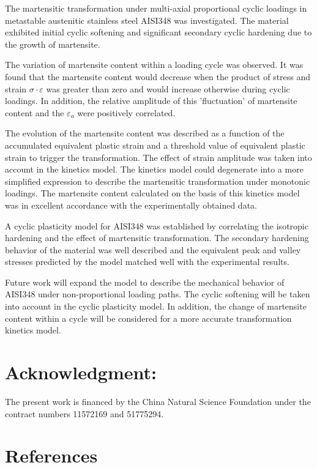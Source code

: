 \documentclass[final,5p,times,onecolumn,10pt,sort&compress]{elsarticle}
\begin{document}
The martensitic transformation under multi-axial proportional cyclic loadings in metastable austenitic stainless steel AISI348 was investigated. The material exhibited initial cyclic softening and significant secondary cyclic hardening due to the growth of martensite.

The variation of martensite content within a loading cycle was observed.  It was found that the martensite content would decrease when the product of stress and strain $\sigma \cdot \varepsilon$ was greater than zero and would increase otherwise during cyclic loadings. In addition, the relative amplitude of this 'fluctuation' of martensite content and the $\varepsilon _{a}$ were positively correlated.

The evolution of the martensite content was described as a function of the accumulated equivalent plastic strain and a threshold value of equivalent plastic strain to trigger the transformation. The effect of strain amplitude was taken into account in the kinetics model. The kinetics model could degenerate into a more simplified expression to describe the martensitic transformation under monotonic loadings. The martensite content calculated on the basis of this kinetics model was in excellent accordance with the experimentally obtained data.

A cyclic plasticity model for AISI348 was established by correlating the isotropic hardening and the effect of martensitic transformation. The secondary hardening behavior of the material was well described and the equivalent peak and valley stresses predicted by the model matched well with the experimental results.

Future work will expand the model to describe the mechanical behavior of AISI348 under non-proportional loading paths. The cyclic softening will be taken into account in the cyclic plasticity model. In addition, the change of martensite content within a cycle will be considered for a more accurate transformation kinetics model.


\section*{Acknowledgment:} The present work is financed by the China Natural Science Foundation under the contract numbers 11572169 and 51775294.

\section*{References}

%
%


\end{document}
